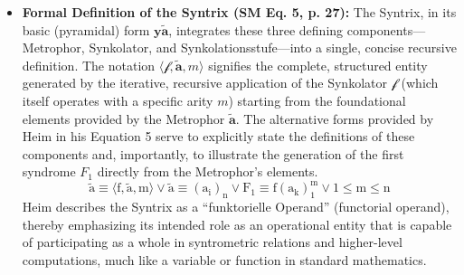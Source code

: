 \documentclass[12pt]{article}
\newcommand{\q}[1]{\enquote{#1}}
\newcommand{\syntrix}{\bm{y\widetilde{a}}}
\newcommand{\metrophor}{\bm{\widetilde{a}}}
\newcommand{\synkolator}{\mathcal{f}}
\newcommand{\synkolationsstufe}{m}
\newcommand{\syndrom}{F} %
\begin{document}
\begin{itemize}
    \item \textbf{Formal Definition of the Syntrix (SM Eq. 5, p. 27):}
    The Syntrix, in its basic (pyramidal) form \( \syntrix \), integrates these three defining components—Metrophor, Synkolator, and Synkolationsstufe—into a single, concise recursive definition. The notation \( \langle \synkolator, \metrophor, \synkolationsstufe \rangle \) signifies the complete, structured entity generated by the iterative, recursive application of the Synkolator \( \synkolator \) (which itself operates with a specific arity \( \synkolationsstufe \)) starting from the foundational elements provided by the Metrophor \( \metrophor \). The alternative forms provided by Heim in his Equation 5 serve to explicitly state the definitions of these components and, importantly, to illustrate the generation of the first syndrome \( \syndrom_1 \) directly from the Metrophor's elements.
        \begin{equation}
        \tilde{\mathrm{a}} \equiv \langle \mathrm{f}, \tilde{\mathrm{a}}, \mathrm{m} \rangle \lor \tilde{\mathrm{a}} \equiv (\mathrm{a}_{\mathrm{i}})_{\mathrm{n}} \lor \mathrm{F}_1 \equiv \mathrm{f}(\mathrm{a}_{\mathrm{k}})_1^{\mathrm{m}} \lor 1 \le \mathrm{m} \le \mathrm{n} \tag{5}
        \label{eq:original_syntrix_definition}
        \end{equation}
    Heim describes the Syntrix as a \q{funktorielle Operand} (functorial operand), thereby emphasizing its intended role as an operational entity that is capable of participating as a whole in syntrometric relations and higher-level computations, much like a variable or function in standard mathematics.


\end{itemize}
\end{document}
